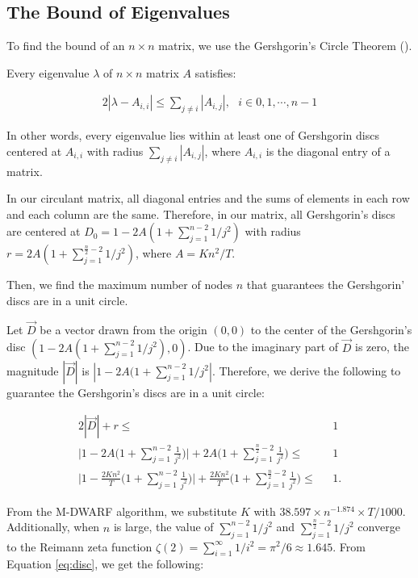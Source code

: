 \subsection{The Bound of Eigenvalues}
\label{sec:bound-mhop}
To find the bound of an $n \times n$ matrix, we use the Gershgorin's Circle Theorem (\cite{gersheng, gershger}).

\begin{thm}
Every eigenvalue $\lambda$ of $n \times n$ matrix $A$ satisfies:

\begin{alignat}{2}
|\lambda - A_{i,i}| \leq \sum_{j \neq i} |A_{i,j}|, \text{ } i \in {0,1,\cdots, n-1} \nonumber
\end{alignat}
\end{thm}

In other words, every eigenvalue lies within at least one of Gershgorin discs centered at $A_{i,i}$ with radius $\sum_{j \neq i} |A_{i,j}|$, where $A_{i,i}$ is the diagonal entry of a matrix.

In our circulant matrix, all diagonal entries and the sums of elements in each row and each column are the same. Therefore, in our matrix, all Gershgorin's discs are centered at $D_0 = 1 - 2A(1 + \sum_{j=1}^{n-2}1/j^2)$ with radius $r = 2A(1 + \sum_{j=1}^{\frac{n}{2}-2}1/j^2)$, where $A = Kn^2/T$.

Then, we find the maximum number of nodes $n$ that guarantees the Gershgorin' discs are in a unit circle.

Let $\vec{D}$ be a vector drawn from the origin $(0,0)$ to the center of the Gershgorin's disc $(1 - 2A(1 + \sum_{j=1}^{n-2}1/j^2), 0)$. Due to the imaginary part of $\vec{D}$ is zero, the magnitude $|\vec{D}|$ is $|1 - 2A(1 + \sum_{j=1}^{n-2}1/j^2|$. Therefore, we derive the following to guarantee the Gershgorin's discs are in a unit circle:

\begin{alignat}{2}
|\vec{D}| + r \leq& \text{ } 1 \nonumber \\
\Bigg|1 - 2A\Bigg(1 + \sum_{j=1}^{n-2}\frac{1}{j^2}\Bigg)\Bigg| + 2A\Bigg(1 + \sum_{j=1}^{\frac{n}{2}-2}\frac{1}{j^2}\Bigg) \leq& \text{ } 1 \nonumber \\
\Bigg|1 - \frac{2Kn^2}{T}\Bigg(1 + \sum_{j=1}^{n-2}\frac{1}{j^2}\Bigg)\Bigg| + \frac{2Kn^2}{T}\Bigg(1 + \sum_{j=1}^{\frac{n}{2}-2}\frac{1}{j^2}\Bigg) \leq& \text{ } 1.
\label{eq:disc}
\end{alignat}

From the M-DWARF algorithm, we substitute $K$ with $38.597 \times n^{-1.874} \times T/1000$. Additionally, when $n$ is large, the value of $\sum_{j=1}^{n-2} 1/j^2$ and $\sum_{j=1}^{\frac{n}{2}-2}1/j^2$ converge to the Reimann zeta function $\zeta (2) = \sum_{i=1}^{\infty}1/i^2 = \pi^2/6 \approx 1.645$. From Equation \ref{eq:disc}, we get the following:


